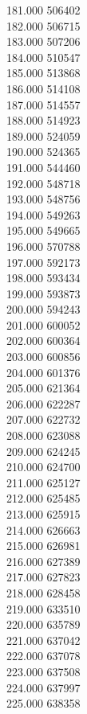 { 181.000	506402 \\
 182.000	506715 \\
 183.000	507206 \\
 184.000	510547 \\
 185.000	513868 \\
 186.000	514108 \\
 187.000	514557 \\
 188.000	514923 \\
 189.000	524059 \\
 190.000	524365 \\
 191.000	544460 \\
 192.000	548718 \\
 193.000	548756 \\
 194.000	549263 \\
 195.000	549665 \\
 196.000	570788 \\
 197.000	592173 \\
 198.000	593434 \\
 199.000	593873 \\
 200.000	594243 \\
 201.000	600052 \\
 202.000	600364 \\
 203.000	600856 \\
 204.000	601376 \\
 205.000	621364 \\
 206.000	622287 \\
 207.000	622732 \\
 208.000	623088 \\
 209.000	624245 \\
 210.000	624700 \\
 211.000	625127 \\
 212.000	625485 \\
 213.000	625915 \\
 214.000	626663 \\
 215.000	626981 \\
 216.000	627389 \\
 217.000	627823 \\
 218.000	628458 \\
 219.000	633510 \\
 220.000	635789 \\
 221.000	637042 \\
 222.000	637078 \\
 223.000	637508 \\
 224.000	637997 \\
 225.000	638358 \\
}

